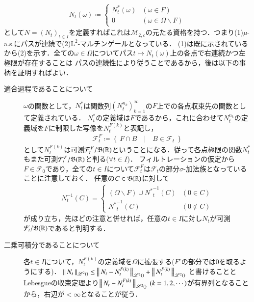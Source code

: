 \begin{description}
			\begin{align}
				N_t(\omega) \coloneqq 
				\begin{cases}
					N^*_t(\omega) & (\omega \in F) \\
					0 & (\omega \in \Omega \backslash F)
				\end{cases}
			\end{align}
			として$N = (N_t)_{t \in I}$を定義すればこれは$\mathcal{M}_{2,c}$の元たる資格を持つ．つまり(1)$\mu$-a.s.にパスが連続で(2)$\mathrm{L}^2$-マルチンゲールとなっている．
			(1)は既に示されているから(2)を示す．全ての$\omega \in \Omega$についてパス$t \longmapsto N_t(\omega)$上の各点で右連続かつ左極限が存在することは
			パスの連続性により従うことであるから，後は以下の事柄を証明すればよい．
			\begin{description}
				\item[適合過程であることについて]
					$\omega$の関数として，$N^*_t$は関数列$(N^{n_k}_t)_{k=1}^{\infty}$の$F$上での各点収束先の関数として定義されている．
					$N^*_t$の定義域は$F$であるから，これに合わせて$N^{n_k}_t$の定義域を$F$に制限した写像を$N^{F(k)}_t$と表記し，
					\begin{align}
						\mathcal{F}^F_t \coloneqq \left\{\ F \cap B\quad |\quad B \in \mathcal{F}_t\ \right\}
					\end{align}
					として$N^{F(k)}_t$は可測$\mathcal{F}^F_t/\mathfrak{B}(\mathbb{R})$ということになる．従って各点極限の関数$N^*_t$もまた可測$\mathcal{F}^F_t/\mathfrak{B}(\mathbb{R})$と判る($\forall t \in I$)．
					フィルトレーションの仮定から$F \in \mathcal{F}_0$であり，全ての$t \in I$について$\mathcal{F}^F_t$は$\mathcal{F}_t$の部分$\sigma$-加法族となっていることに注意しておく．
					任意の$C \in \mathfrak{B}(\mathbb{R})$に対して
					\begin{align}
						N^{-1}_t(C) = 
						\begin{cases}
							(\Omega \backslash F) \cup {N^*}^{-1}_t(C) & (0 \in C) \\
							{N^*}^{-1}_t(C) & (0 \notin C)
						\end{cases}
					\end{align}
					が成り立ち，先ほどの注意と併せれば，任意の$t \in I$に対し$N_t$が可測$\mathcal{F}_t/\mathfrak{B}(\mathbb{R})$であると判明する．
				
				\item[二乗可積分であることについて]
					各$t \in I$について，$N^{F(k)}_t$の定義域を$\Omega$に拡張する($F^c$の部分では0を取るようにする)．
					$\left\|\, N_t\, \right\|_{\mathscr{L}^{2} \left(\right)} \leq \left\|\, N_t - N^{F(k)}_t\, \right\|_{\mathscr{L}^{2} \left(\right)} + \left\|\, N^{F(k)}_t\, \right\|_{\mathscr{L}^{2} \left(\right)}$
					と書けることとLebesgueの収束定理より$\Norm{N_t - N^{F(k)}_t}{\semiLp{2}{}}\ (k=1,2,\cdots)$が有界列となることから，右辺が$< \infty$となることが従う．
				
				\item[]
			\end{description}
				
			
	\end{description}
	
	
	
